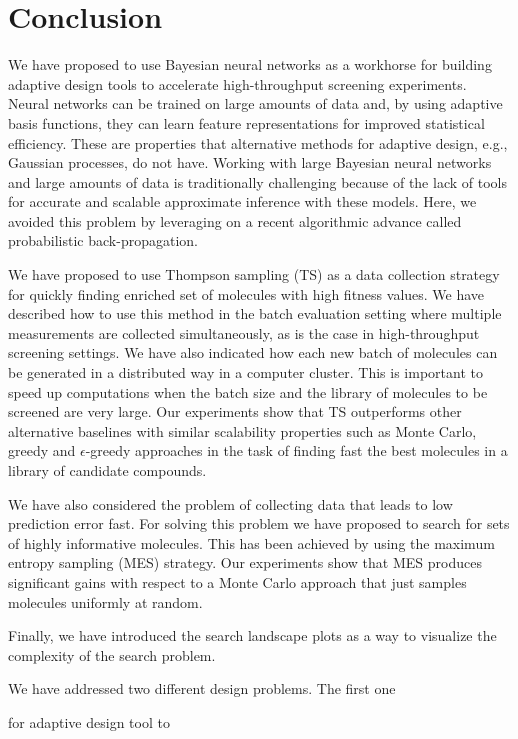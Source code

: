 \section{Conclusion}

We have proposed to use Bayesian neural networks as a workhorse for building adaptive design tools to accelerate high-throughput screening experiments. Neural networks can be trained on large amounts of data and, by using adaptive basis functions, they can learn feature representations for improved statistical efficiency. These are properties that alternative methods for adaptive design, e.g., Gaussian processes, do not have. Working with large Bayesian neural networks and large amounts of data is traditionally challenging because of the lack of tools for accurate and scalable approximate inference with these models. Here, we avoided this problem by leveraging on a recent algorithmic advance called probabilistic back-propagation.

We have proposed to use Thompson sampling (TS) as a data collection strategy for quickly finding enriched set of molecules with high fitness values. We have described how to use this method in the batch evaluation setting where multiple measurements are collected simultaneously, as is the case in high-throughput screening settings. We have also indicated how each new batch of molecules can be generated in a distributed way in a computer cluster. This is important to speed up computations when the batch size and the library of molecules to be screened are very large. Our experiments show that TS outperforms other alternative baselines with similar scalability properties such as Monte Carlo, greedy and $\epsilon$-greedy approaches in the task of finding fast the best molecules in a library of candidate compounds.

We have also considered the problem of collecting data that leads to low prediction error fast. For solving this problem we have proposed to search for sets of highly informative molecules. This has been achieved by using the maximum entropy sampling (MES) strategy. Our experiments show that MES produces significant gains with respect to a Monte Carlo approach that just samples molecules uniformly at random.

Finally, we have introduced the search landscape plots as a way to visualize the complexity of the search problem.

We have addressed two different design problems. The first one

for adaptive design tool to


